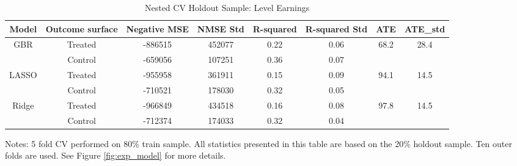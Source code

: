 \documentclass[12pt, a4paper]{article}
\begin{document}
\begin{landscape}
\clearpage
\begin{table}[htbp]
\centering
\small
\caption{Nested CV Holdout Sample: Level Earnings}
\begin{tabular}{cccccccc}
\toprule
Model   &  Outcome surface  &  Negative MSE  &  NMSE Std  &  R-squared  &  R-squared Std  & ATE   & ATE\_std   \\
\midrule                         
\multirow{2}{*}{\hfil GBR}  &  Treated  &  -886515  &  452077 &  0.22  &  0.06  &  \multirow{2}{*}{\hfil 68.2}  &  \multirow{2}{*}{\hfil  28.4 }	 \\
&  Control  &  -659056  &  107251	 &  0.36 & 0.07  & & \\
\midrule																						
\multirow{2}{*}{\hfil LASSO} & Treated & -955958	 & 361911	 & 0.15	 & 0.09	 & \multirow{2}{*}{\hfil 94.1}	 & \multirow{2}{*}{\hfil 14.5}	 \\
& Control	 & -710521 & 	178030	 & 0.32	 & 0.05	 & & \\
\midrule  																								
\multirow{2}{*}{\hfil Ridge}	 & Treated	 & -966849	& 434518	 & 0.16	 & 0.08	 &  \multirow{2}{*}{\hfil  97.8}  &  \multirow{2}{*}{\hfil 14.5}	 \\
&  Control  &  -712374  &  174033  &  0.32  &  0.04  & & \\
\bottomrule
\end{tabular}
\par\medskip
\parbox{1.1\textwidth}{\footnotesize Notes: 5 fold CV performed on 80\% train sample. All statistics presented in this table are based on the 20\% holdout sample. Ten outer folds are used. See Figure \ref{fig:exp_model} for more details.} \\
\label{tab:ncvhos}
\end{table}


\end{landscape}
\end{document}
